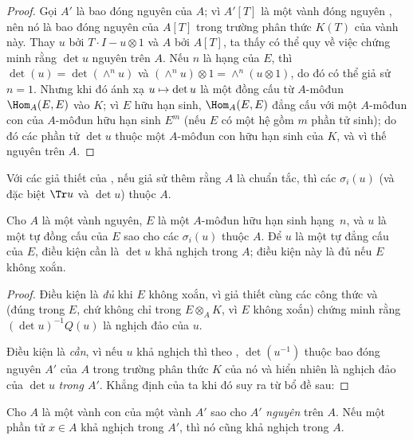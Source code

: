 \documentclass[oneside,10pt]{amsart}
\makeatletter
\newcommand{\ega@arrow}[2]{\mathchoice{#1}{#2}{#2}{#2}}
\let\ega@shortmapsto\mapsto
\renewcommand{\mapsto}{\ega@arrow{\longmapsto}{\ega@shortmapsto}}
\newcommand{\oldpage}[2][]{\marginnote{\normalfont\footnotesize\textbf{#1}~|~#2}\ignorespaces}
\let\EGAOriginalLabel\label
\renewcommand{\label}[1]{\phantomsection\EGAOriginalLabel{#1}}
\makeatother
\begin{document}
\begin{proof}
Gọi $A'$ là bao đóng nguyên của $A$;
vì $A'[T]$ là một vành đóng nguyên \cite[p.~99]{II-24}, nên nó là bao đóng nguyên của $A[T]$ trong trường phân thức $K(T)$ của vành này.
Thay $u$ bởi $T\cdot I-u\otimes1$ và $A$ bởi $A[T]$, ta thấy có thể quy về việc chứng minh rằng $\det u$ nguyên trên $A$.
Nếu $n$ là hạng của $E$, thì $\det(u)=\det(\wedge^n u)$ và $(\wedge^n u)\otimes1=\wedge^n(u\otimes1)$, do đó có thể giả sử $n=1$.
Nhưng khi đó ánh xạ $u\mapsto\det u$ là một đồng cấu từ $A$-môđun $\Hom_A(E,E)$ vào $K$;
vì $E$ hữu hạn sinh, $\Hom_A(E,E)$ đẳng cấu với một $A$-môđun con của $A$-môđun hữu hạn sinh $E^m$ (nếu $E$ có một hệ gồm $m$ phần tử sinh); do đó các phần tử $\det u$ thuộc một $A$-môđun con hữu hạn sinh của $K$, và vì thế nguyên trên $A$.
\end{proof}
\oldpage[II]{122}
\begin{corollary}[6.4.4]
\label{II.6.4.4}
Với các giả thiết của , nếu giả sử thêm rằng $A$ là chuẩn tắc, thì các $\sigma_i(u)$ (và đặc biệt $\Tr u$ và $\det u$) thuộc $A$.
\end{corollary}

\begin{proposition}[6.4.5]
\label{II.6.4.5}
Cho $A$ là một vành nguyên, $E$ là một $A$-môđun hữu hạn sinh hạng~$n$, và $u$ là một tự đồng cấu của $E$ sao cho các $\sigma_i(u)$ thuộc $A$.
Để $u$ là một tự đẳng cấu của $E$, điều kiện cần là $\det u$ khả nghịch trong $A$;
điều kiện này là đủ nếu $E$ không xoắn.
\end{proposition}

\begin{proof}
Điều kiện là \emph{đủ} khi $E$ không xoắn, vì giả thiết cùng các công thức  và  (đúng trong $E$, chứ không chỉ trong $E\otimes_A K$, vì $E$ không xoắn) chứng minh rằng $(\det u)^{-1}Q(u)$ là nghịch đảo của $u$.

Điều kiện là \emph{cần}, vì nếu $u$ khả nghịch thì theo , $\det(u^{-1})$ thuộc bao đóng nguyên $A'$ của $A$ trong trường phân thức $K$ của nó và hiển nhiên là nghịch đảo của $\det u$ \emph{trong $A'$}.
Khẳng định của ta khi đó suy ra từ bổ đề sau:
\end{proof}

\begin{lemma}[6.4.5.1]
\label{II.6.4.5.1}
Cho $A$ là một vành con của một vành $A'$ sao cho $A'$ \emph{nguyên} trên $A$.
Nếu một phần tử $x\in A$ khả nghịch trong $A'$, thì nó cũng khả nghịch trong $A$.
\end{lemma}
\end{document}
